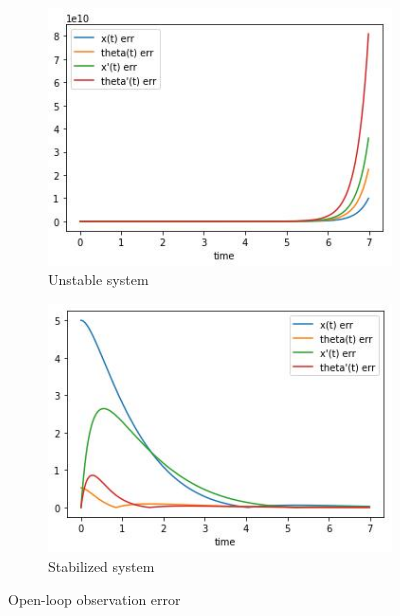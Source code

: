 \documentclass[12pt,letterpaper]{article}
\begin{document}
    \begin{figure}[htb]
        \begin{subfigure}{.5\textwidth}
            \centering
            \includegraphics[width=1\linewidth]{images/openloop/unstable.jpg}
            \caption{Unstable system}
            \label{fig:openloop_unstable_error}
        \end{subfigure}
        \begin{subfigure}{.5\textwidth}
          \centering
          \includegraphics[width=1\linewidth]{images/openloop/stabilized.jpg}
          \caption{Stabilized system}
        \label{fig:openloop_stable_error}
        \end{subfigure}
    \caption{Open-loop observation error}
    \label{fig:openloop_error}
    \end{figure}
\end{document}
